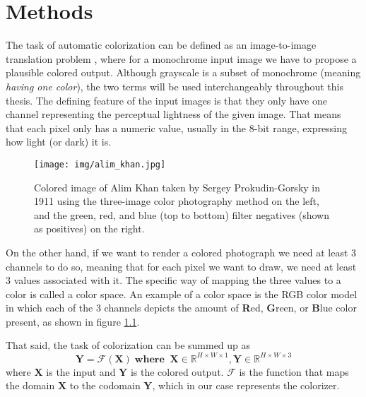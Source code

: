 \begin{comment}
    Use cases
    Multimodality

    Neural networks:
        Basics
        CNN
        U-NET

    Dataset

    Implementations:
        Colorful image colorization
        GAN/pix2pix
        IDeep
\end{comment}

\chapter{Methods}

The task of automatic colorization can be defined as an image-to-image 
translation problem \citep{pang2021imagetoimage}, where for a monochrome 
input image we have to propose a plausible colored output. Although 
grayscale is a subset of monochrome (meaning \textit{having one color}), 
the two terms will be used interchangeably throughout this thesis. 
The defining feature of the input images is that they only have one channel 
representing the perceptual lightness of the given image. That means that 
each pixel only has a numeric value, usually in the 8-bit range, 
expressing how light (or dark) it is. 

\begin{figure}[H]
    \centering
    \texttt{[image: img/alim\_khan.jpg]}
    \caption{
    Colored image of Alim Khan taken by Sergey Prokudin-Gorsky 
    in 1911 using the three-image color photography method on the left,
    and the green, red, and blue (top to bottom) filter negatives
    (shown as positives) on the right.}
    \label{fig:alim_khan}
\end{figure}

On the other hand, if we want to render a colored photograph we need at 
least 3 channels to do so, meaning that for each pixel we want to draw, 
we need at least 3 values associated with it. The specific way of mapping 
the three values to a color is called a color space. An example of a color
space is the RGB color model in which each of the 3 channels depicts the 
amount of \textbf{R}ed, \textbf{G}reen, or \textbf{B}lue color present,
as shown in figure \ref{fig:alim_khan}. 

That said, the task of colorization can be summed up as
\begin{equation}
    \mathbf{Y} = \mathcal{F}(\mathbf{X})\;\mathbf{where}\;\;\mathbf{X} \in \mathbb{R}^{H \times W \times 1}, \mathbf{Y} \in \mathbb{R}^{H \times W \times 3}\label{eq:colorization}
\end{equation}    
where $\mathbf{X}$ is the input 
and $\mathbf{Y}$ is the colored output.
$\mathcal{F}$ is the function that maps the domain $\mathbf{X}$ to the codomain 
$\mathbf{Y}$, which in our case represents the colorizer.

